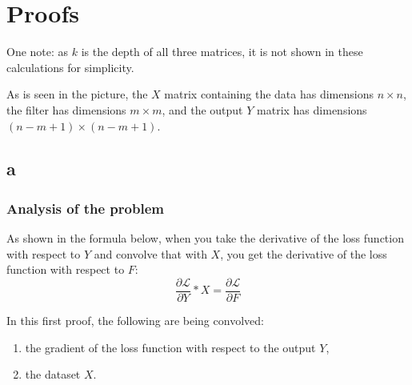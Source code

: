 \documentclass{article}
\begin{document}
\newpage
\section{Proofs}


One note: as \( k \) is the depth of all three matrices, it is not shown in these calculations for simplicity.

As is seen in the picture, the \( X \) matrix containing the data has dimensions \( n \times n \), the filter has dimensions \( m \times m \), and the output \( Y \) matrix has dimensions \( (n - m + 1) \times (n - m + 1) \).

\subsection*{a}

\subsubsection{Analysis of the problem}

As shown in the formula below, when you take the derivative of the loss function with respect to \( Y \) and convolve that with \( X \), you get the derivative of the loss function with respect to \( F \):
\[
\frac{\partial \mathcal{L}}{\partial Y} \ast X = \frac{\partial \mathcal{L}}{\partial F}
\]

In this first proof, the following are being convolved: 
\begin{enumerate}
    \item the gradient of the loss function with respect to the output \( Y \), 
    \item the dataset \( X \).
\end{enumerate}
\end{document}
